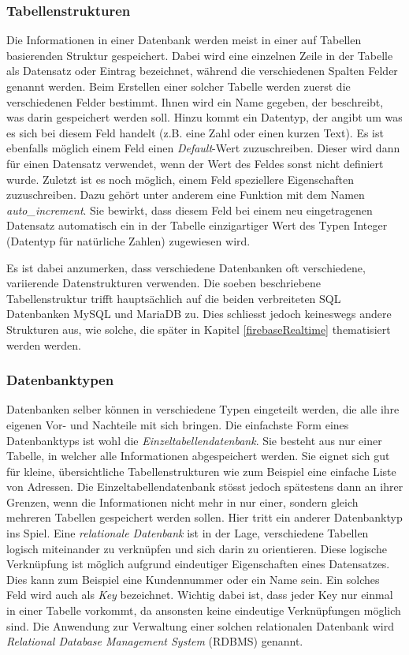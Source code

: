 \documentclass[../main.tex]{subfiles}
\begin{document}
	\subsubsection*{Tabellenstrukturen}
	Die Informationen in einer Datenbank werden meist in einer auf Tabellen basierenden Struktur gespeichert. Dabei wird eine einzelnen Zeile in der Tabelle als Datensatz oder Eintrag bezeichnet, während die verschiedenen Spalten Felder genannt werden. Beim Erstellen einer solcher Tabelle werden zuerst die verschiedenen Felder bestimmt. Ihnen wird ein Name gegeben, der beschreibt, was darin gespeichert werden soll. Hinzu kommt ein Datentyp, der angibt um was es sich bei diesem Feld handelt (z.B. eine Zahl oder einen kurzen Text). Es ist ebenfalls möglich einem Feld einen \emph{Default}-Wert zuzuschreiben. Dieser wird dann für einen Datensatz verwendet, wenn der Wert des Feldes sonst nicht definiert wurde. Zuletzt ist es noch möglich, einem Feld speziellere Eigenschaften zuzuschreiben. Dazu gehört unter anderem eine Funktion mit dem Namen \emph{auto\_increment}. Sie bewirkt, dass diesem Feld bei einem neu eingetragenen Datensatz automatisch ein in der Tabelle einzigartiger Wert des Typen Integer (Datentyp für natürliche Zahlen) zugewiesen wird.
	
	Es ist dabei anzumerken, dass verschiedene Datenbanken oft verschiedene, variierende Datenstrukturen verwenden. Die soeben beschriebene Tabellenstruktur trifft hauptsächlich auf die beiden verbreiteten SQL Datenbanken MySQL und MariaDB zu. Dies schliesst jedoch keineswegs andere Strukturen aus, wie solche, die später in Kapitel \ref{firebaseRealtime} thematisiert werden werden.
	
	\subsubsection*{Datenbanktypen}
	Datenbanken selber können in verschiedene Typen eingeteilt werden, die alle ihre eigenen Vor- und Nachteile mit sich bringen. Die einfachste Form eines Datenbanktyps ist wohl die \emph{Einzeltabellendatenbank}. Sie besteht aus nur einer Tabelle, in welcher alle Informationen abgespeichert werden. Sie eignet sich gut für kleine, übersichtliche Tabellenstrukturen wie zum Beispiel eine einfache Liste von Adressen. Die Einzeltabellendatenbank stösst jedoch spätestens dann an ihrer Grenzen, wenn die Informationen nicht mehr in nur einer, sondern gleich mehreren Tabellen gespeichert werden sollen. Hier tritt ein anderer Datenbanktyp ins Spiel. Eine \emph{relationale Datenbank} ist in der Lage, verschiedene Tabellen logisch miteinander zu verknüpfen und sich darin zu orientieren. Diese logische Verknüpfung ist möglich aufgrund eindeutiger Eigenschaften eines Datensatzes. Dies kann zum Beispiel eine Kundennummer oder ein Name sein. Ein solches Feld wird auch als \emph{Key} bezeichnet. Wichtig dabei ist, dass jeder Key nur einmal in einer Tabelle vorkommt, da ansonsten keine eindeutige Verknüpfungen möglich sind. Die Anwendung zur Verwaltung einer solchen relationalen Datenbank wird \emph{Relational Database Management System} (RDBMS) genannt. \cite[S. 745 - 751]{IT-Handbuch}
	
\end{document}
